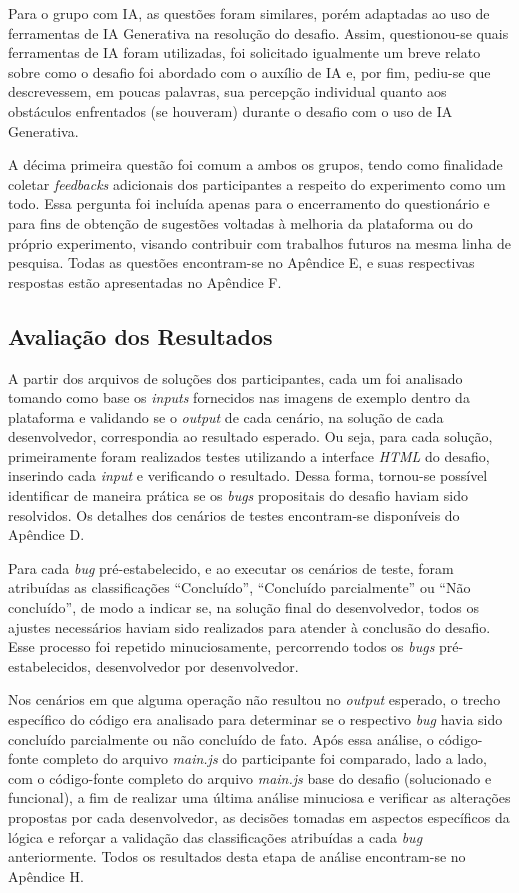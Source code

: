 \documentclass[english,brazilian]{UNISINOSartigo} %
\begin{document}
Para o grupo com IA, as questões foram similares, porém adaptadas ao uso de ferramentas de IA Generativa na resolução do desafio. Assim, questionou-se quais ferramentas de IA foram utilizadas, foi solicitado igualmente um breve relato sobre como o desafio foi abordado com o auxílio de IA e, por fim, pediu-se que descrevessem, em poucas palavras, sua percepção individual quanto aos obstáculos enfrentados (se houveram) durante o desafio com o uso de IA Generativa.

A décima primeira questão foi comum a ambos os grupos, tendo como finalidade coletar \textit{feedbacks} adicionais dos participantes a respeito do experimento como um todo. Essa pergunta foi incluída apenas para o encerramento do questionário e para fins de obtenção de sugestões voltadas à melhoria da plataforma ou do próprio experimento, visando contribuir com trabalhos futuros na mesma linha de pesquisa. Todas as questões encontram-se no Apêndice E, e suas respectivas respostas estão apresentadas no Apêndice F.

\subsection{Avaliação dos Resultados}

A partir dos arquivos de soluções dos participantes, cada um foi analisado tomando como base os \textit{inputs} fornecidos nas imagens de exemplo dentro da plataforma e validando se o \textit{output} de cada cenário, na solução de cada desenvolvedor, correspondia ao resultado esperado. Ou seja, para cada solução, primeiramente foram realizados testes utilizando a interface \textit{HTML} do desafio, inserindo cada \textit{input} e verificando o resultado. Dessa forma, tornou-se possível identificar de maneira prática se os \textit{bugs} propositais do desafio haviam sido resolvidos. Os detalhes dos cenários de testes encontram-se disponíveis do Apêndice D.

Para cada \textit{bug} pré-estabelecido, e ao executar os cenários de teste, foram atribuídas as classificações “Concluído”, “Concluído parcialmente” ou “Não concluído”, de modo a indicar se, na solução final do desenvolvedor, todos os ajustes necessários haviam sido realizados para atender à conclusão do desafio. Esse processo foi repetido minuciosamente, percorrendo todos os \textit{bugs} pré-estabelecidos, desenvolvedor por desenvolvedor.

Nos cenários em que alguma operação não resultou no \textit{output} esperado, o trecho específico do código era analisado para determinar se o respectivo \textit{bug} havia sido concluído parcialmente ou não concluído de fato. Após essa análise, o código-fonte completo do arquivo \textit{main.js} do participante foi comparado, lado a lado, com o código-fonte completo do arquivo \textit{main.js} base do desafio (solucionado e funcional), a fim de realizar uma última análise minuciosa e verificar as alterações propostas por cada desenvolvedor, as decisões tomadas em aspectos específicos da lógica e reforçar a validação das classificações atribuídas a cada \textit{bug} anteriormente. Todos os resultados desta etapa de análise encontram-se no Apêndice H.
\end{document}

